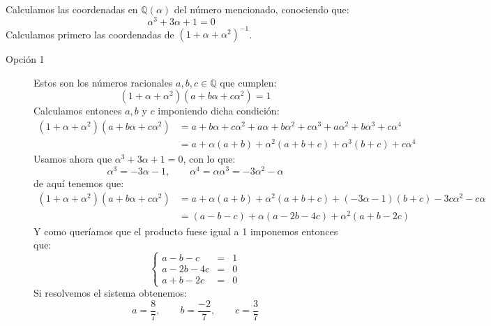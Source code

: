 \begin{ejercicio}
    \noindent
    Calculamos las coordenadas en $\mathbb{Q}(\alpha)$ del número mencionado, conociendo que:
    \begin{equation*}
        \alpha^3 + 3\alpha + 1 = 0
    \end{equation*} 
    Calculamos primero las coordenadas de ${(1+\alpha+\alpha^2)}^{-1}$.
    \begin{description}
        \item[Opción 1] Estos son los números racionales $a,b,c\in \mathbb{Q}$ que cumplen:
        \begin{equation*}
            (1+\alpha+\alpha^2)(a+b\alpha + c\alpha^2) = 1
        \end{equation*}
        Calculamos entonces $a,b$ y $c$ imponiendo dicha condición:
        \begin{align*}
            (1+\alpha+\alpha^2)(a+b\alpha+c\alpha^2) &= a + b\alpha + c\alpha^2 + a\alpha + b\alpha^2 + c\alpha^3 + a\alpha^2 + b\alpha^3 + c\alpha^4 \\
                                                    &= a + \alpha(a+b) + \alpha^2(a+b+c) + \alpha^3 (b+c) + c\alpha^4
        \end{align*}
        Usamos ahora que $\alpha^3 + 3\alpha + 1 = 0$, con lo que:
        \begin{equation*}
            \alpha^3 = -3\alpha - 1, \qquad \alpha^4 = \alpha \alpha^3 = -3\alpha^2 - \alpha
        \end{equation*}
        de aquí tenemos que:
        \begin{align*}
            (1+\alpha+\alpha^2)(a+b\alpha+c\alpha^2) &= a + \alpha(a+b) + \alpha^2 (a+b+c) + (-3\alpha-1)(b+c) - 3c\alpha^2 - c\alpha \\
                                                    &= (a-b-c) + \alpha(a-2b-4c) + \alpha^2 (a+b-2c)
        \end{align*}
        Y como queríamos que el producto fuese igual a 1 imponemos entonces que:
        \begin{equation*}
            \left\{\begin{array}{rcl}
                    a-b-c & = & 1 \\
                    a-2b-4c &=& 0 \\
                    a+b-2c &=& 0
            \end{array}\right.
        \end{equation*}
        Si resolvemos el sistema obtenemos:
        \begin{equation*}
            a = \frac{8}{7}, \qquad b = \frac{-2}{7},\qquad c = \frac{3}{7}
        \end{equation*}


\end{description}
\end{ejercicio}
